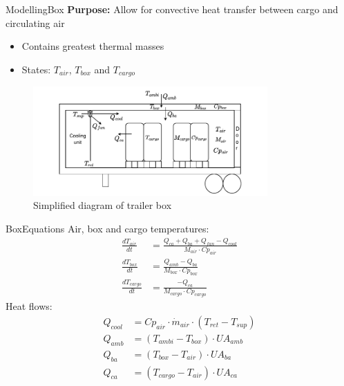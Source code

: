 
\begin{frame}{Modelling}{Box}
	\textbf{Purpose:} Allow for convective heat transfer between cargo and circulating air
	\begin{itemize}
		\item Contains greatest thermal masses
		\item States: $T_{air}$, $T_{box}$ and $T_{cargo}$
	\end{itemize}
	\begin{figure}[h!]
		\centering
		\includegraphics[width=0.8\textwidth]{../Graphics/Box.pdf}
		\caption{Simplified diagram of trailer box}
		\label{fig:box_diagram}
	\end{figure}


\end{frame}

\begin{frame}{Box}{Equations}
	Air, box and cargo temperatures:
	\begin{align}
		\frac{dT_{air}}{dt} &= \frac{Q_{ca} + Q_{ba} + Q_{fan} -Q_{cool}}{M_{air} \cdot Cp_{air}} \label{eq:box_dT_air} \\
		\frac{dT_{box}}{dt} &= \frac{Q_{amb} - Q_{ba}}{M_{box} \cdot Cp_{box}} \label{eq:box_dT_box} \\
		\frac{dT_{cargo}}{dt} &= \frac{-Q_{ca}}{M_{cargo} \cdot Cp_{cargo}} \label{eq:box_dT_cargo}
	\end{align}
	Heat flows:
	\begin{align}
		Q_{cool}   & = Cp_{air} \cdot \dot{m}_{air} \cdot (T_{ret} - T_{sup})	\label{eq:box_Qcool} \\
		Q_{amb}    & = (T_{ambi} - T_{box}) \cdot U A_{amb}						\label{eq:box_Qab}   \\
		Q_{ba}     & = (T_{box} - T_{air}) \cdot U A_{ba}						\label{eq:box_Qba}   \\
		Q_{ca}     & = (T_{cargo} - T_{air}) \cdot U A_{ca}                  	\label{eq:box_Qca}
	\end{align}
\end{frame}



